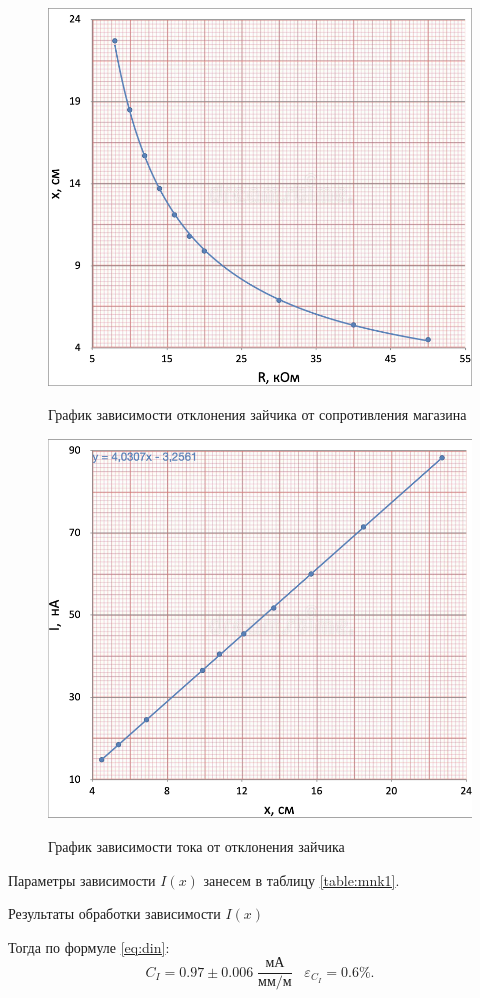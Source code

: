 \documentclass[12pt,a4paper]{article}
\begin{document}
\begin{figure}[H]
	\caption{График зависимости отклонения зайчика от сопротивления магазина}
	\includegraphics[width = 9.8 cm]{src/xR.png}
	\label{fig:plt1}
\end{figure}

\begin{figure}[H]
	\caption{График зависимости тока от отклонения зайчика}
	\includegraphics[width = 9.8 cm]{src/Ix.png}
	\label{fig:plt2}
\end{figure}

Параметры зависимости $I(x)$ занесем в таблицу \ref{table:mnk1}.

\begin{table}[H]
	\caption{Результаты обработки зависимости $I(x)$}
	
	\label{table:mnk1}
\end{table}

Тогда по формуле \ref{eq:din}: 
    $$ C_I = 0.97 \pm 0.006\; \frac{\text{мА}}{\text{мм}/\text{м}} \;\;\; \varepsilon_{C_I} = 0.6\%. $$
\end{document}
